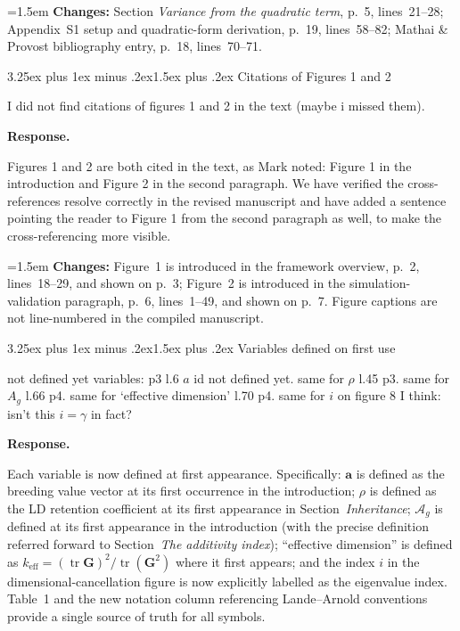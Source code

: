 \documentclass[11pt,a4paper]{article}
\makeatletter
\newcommand{\response}{%
  \par\medskip\noindent\textbf{\color{ResponseColor}Response.}\quad\ignorespaces
}
\newcommand{\changesat}[1]{%
  \par\smallskip\noindent\hangindent=1.5em\hangafter=1
  \textbf{\color{ChangeColor}Changes:} \quad #1\par\medskip
}
\renewcommand{\subsection}{\@startsection{subsection}{2}{0pt}%
  {3.25ex plus 1ex minus .2ex}{1.5ex plus .2ex}%
  {\large\bfseries}}
\newcommand{\Ag}{\ensuremath{\mathcal{A}_{g}}\xspace}
\newcommand{\mat}[1]{\ensuremath{\mathbf{#1}}}
\newcommand{\vect}[1]{\ensuremath{\bm{#1}}}
\newcommand{\keff}{\ensuremath{k_{\mathrm{eff}}}\xspace}
\newcommand{\tr}{\ensuremath{\operatorname{tr}}\xspace}
\makeatother
\begin{document}
\changesat{Section \textit{Variance from the quadratic term}, p.~5, lines~21--28; Appendix~S1 setup and quadratic-form derivation, p.~19, lines~58--82; Mathai \& Provost bibliography entry, p.~18, lines~70--71.}

\subsection{Citations of Figures 1 and 2}

\begin{edquote}
I did not find citations of figures 1 and 2 in the text (maybe i missed them).
\end{edquote}

\response
Figures 1 and 2 are both cited in the text, as Mark noted: Figure 1 in the introduction and Figure 2 in the second paragraph. We have verified the cross-references resolve correctly in the revised manuscript and have added a sentence pointing the reader to Figure 1 from the second paragraph as well, to make the cross-referencing more visible.

\changesat{Figure~1 is introduced in the framework overview, p.~2, lines~18--29, and shown on p.~3; Figure~2 is introduced in the simulation-validation paragraph, p.~6, lines~1--49, and shown on p.~7. Figure captions are not line-numbered in the compiled manuscript.}

\subsection{Variables defined on first use}

\begin{edquote}
not defined yet variables: p3 l.6 $a$ id not defined yet. same for $\rho$ l.45 p3. same for $A_g$ l.66 p4. same for ‘effective dimension’ l.70 p4. same for $i$ on figure 8 I think: isn't this $i=\gamma$ in fact?
\end{edquote}

\response
Each variable is now defined at first appearance. Specifically: $\vect{a}$ is defined as the breeding value vector at its first occurrence in the introduction; $\rho$ is defined as the LD retention coefficient at its first appearance in Section~\textit{Inheritance}; $\Ag$ is defined at its first appearance in the introduction (with the precise definition referred forward to Section~\textit{The additivity index}); ``effective dimension'' is defined as $\keff = (\tr\mat{G})^2/\tr(\mat{G}^2)$ where it first appears; and the index $i$ in the dimensional-cancellation figure is now explicitly labelled as the eigenvalue index. Table~1 and the new notation column referencing Lande--Arnold conventions provide a single source of truth for all symbols.
\end{document}
